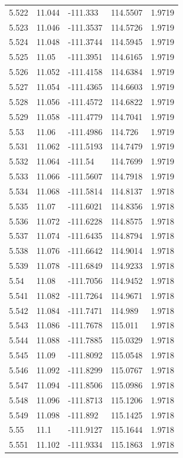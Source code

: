 \begin{tabular}{lllll}
5.522 & 11.044 & -111.333 & 114.5507 & 1.9719 \\
5.523 & 11.046 & -111.3537 & 114.5726 & 1.9719 \\
5.524 & 11.048 & -111.3744 & 114.5945 & 1.9719 \\
5.525 & 11.05 & -111.3951 & 114.6165 & 1.9719 \\
5.526 & 11.052 & -111.4158 & 114.6384 & 1.9719 \\
5.527 & 11.054 & -111.4365 & 114.6603 & 1.9719 \\
5.528 & 11.056 & -111.4572 & 114.6822 & 1.9719 \\
5.529 & 11.058 & -111.4779 & 114.7041 & 1.9719 \\
5.53 & 11.06 & -111.4986 & 114.726 & 1.9719 \\
5.531 & 11.062 & -111.5193 & 114.7479 & 1.9719 \\
5.532 & 11.064 & -111.54 & 114.7699 & 1.9719 \\
5.533 & 11.066 & -111.5607 & 114.7918 & 1.9719 \\
5.534 & 11.068 & -111.5814 & 114.8137 & 1.9718 \\
5.535 & 11.07 & -111.6021 & 114.8356 & 1.9718 \\
5.536 & 11.072 & -111.6228 & 114.8575 & 1.9718 \\
5.537 & 11.074 & -111.6435 & 114.8794 & 1.9718 \\
5.538 & 11.076 & -111.6642 & 114.9014 & 1.9718 \\
5.539 & 11.078 & -111.6849 & 114.9233 & 1.9718 \\
5.54 & 11.08 & -111.7056 & 114.9452 & 1.9718 \\
5.541 & 11.082 & -111.7264 & 114.9671 & 1.9718 \\
5.542 & 11.084 & -111.7471 & 114.989 & 1.9718 \\
5.543 & 11.086 & -111.7678 & 115.011 & 1.9718 \\
5.544 & 11.088 & -111.7885 & 115.0329 & 1.9718 \\
5.545 & 11.09 & -111.8092 & 115.0548 & 1.9718 \\
5.546 & 11.092 & -111.8299 & 115.0767 & 1.9718 \\
5.547 & 11.094 & -111.8506 & 115.0986 & 1.9718 \\
5.548 & 11.096 & -111.8713 & 115.1206 & 1.9718 \\
5.549 & 11.098 & -111.892 & 115.1425 & 1.9718 \\
5.55 & 11.1 & -111.9127 & 115.1644 & 1.9718 \\
5.551 & 11.102 & -111.9334 & 115.1863 & 1.9718 \\

\end{tabular}
